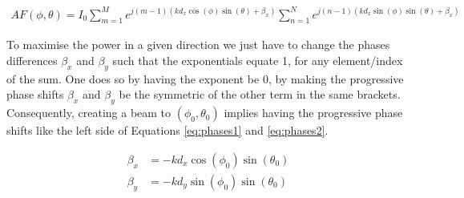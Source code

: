 \begin{align}
    AF(\phi, \theta) = I_0 \sum_{m=1}^{M} e^{j (m-1) \left(k d_x \cos(\phi)\sin(\theta) + \beta_x\right)} \sum_{n=1}^{N} e^{j (n-1) \left(k d_x \sin(\phi)\sin(\theta) + \beta_x\right)} \label{eq:af}
\end{align}


To maximise the power in a given direction we just have to change the phases differences $\beta_x$ and $\beta_y$ such that the exponentials equate 1, for any element/index of the sum. One does so by having the exponent be 0, by making the progressive phase shifts $\beta_x$ and $\beta_y$ be the symmetric of the other term in the same brackets. Consequently, creating a beam to $(\phi_0, \theta_0)$ implies having the progressive phase shifts like the left side of Equations \eqref{eq:phases1} and \eqref{eq:phases2}.

\begin{subequations}
    \begin{align}
        \beta_x &= -k d_x \cos(\phi_0) \sin(\theta_0) \label{eq:phases1} \\
        \beta_y &= -k d_y \sin(\phi_0) \sin(\theta_0) \label{eq:phases2}
    \end{align}
\end{subequations}

